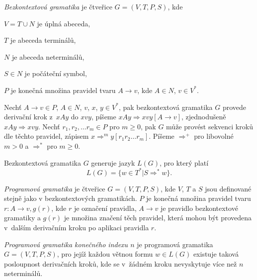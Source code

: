 \begin{Def}\label{def_bezkontext_gram}

\emph{Bezkontextová gramatika} \cite{Krivka:RewritingSystems} je čtveřice $G = (V,T,P,S)$, kde 
\begin{description*}
\item $V = T \cup N$ je úplná abeceda, 
\item $T$ je abeceda terminálů, 
\item $N$ je abeceda neterminálů, 
\item $S \in N$ je počáteční symbol, 
\item $P$ je konečná množina pravidel tvaru $A \rightarrow v$, kde $A \in N$, $v \in V^*$.
\end{description*}
Nechť $A \rightarrow v \in P$, $A \in N$, $v$, $x$, $y \in V^*$, pak bezkontextová gramatika $G$ provede derivační krok z~$xAy$ do $xvy$, píšeme $xAy \Rightarrow xvy [A \rightarrow v]$, zjednodušeně $xAy \Rightarrow xvy$. 
Nechť $r_1, r_2, \dots r_m \in P$ pro $m \ge 0$, pak $G$ může provést sekvenci kroků dle těchto pravidel, zápisem $x {\Rightarrow}^m y [r_1 r_2 \dots r_m]$. Píšeme ${\Rightarrow}^+$ pro libovolné $m > 0$ a ${\Rightarrow}^*$ pro $m \ge 0$. 

Bezkontextová gramatika $G$ generuje jazyk $L(G)$, pro který platí $$L(G) = \{w \in T^* | S {\Rightarrow}^* w\}.$$ 

\end{Def}

\begin{Def}
\emph{Programová gramatika} \cite{Krivka:RewritingSystems} je čtveřice $G = (V,T,P,S)$, kde $V$, $T$ a $S$ jsou definované stejně jako v bezkontextových gramatikách. $P$ je konečná množina pravidel tvaru $r \colon A \rightarrow v, g(r)$, kde $r$ je označení pravidla, $A \rightarrow v$ je pravidlo bezkontextové gramatiky a $g(r)$ je množina značení těch pravidel, která mohou být provedena v~dalším derivačním kroku po aplikaci pravidla $r$.
\end{Def}

\begin{Def}
\emph{Programová gramatika konečného indexu $n$} \cite{Krivka:RewritingSystems} je programová gramatika $G = (V,T,P,S)$, pro jejíž každou větnou formu $w \in L(G)$ existuje taková posloupnost derivačních kroků, kde se v~žádném kroku nevyskytuje více než $n$ neterminálů.
\end{Def}

